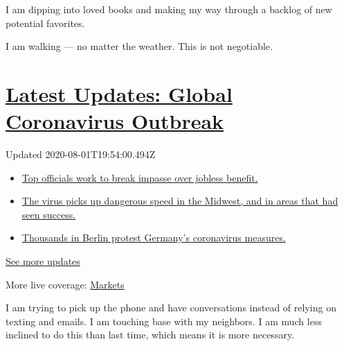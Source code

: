 I am dipping into loved books and making my way through a backlog of new
potential favorites.

I am walking --- no matter the weather. This is not negotiable.

\hypertarget{latest-updates-global-coronavirus-outbreak}{%
\section{\texorpdfstring{\href{https://www.nytimes3xbfgragh.onion/2020/08/01/world/coronavirus-covid-19.html?action=click\&pgtype=Article\&state=default\&region=MAIN_CONTENT_1\&context=storylines_live_updates}{Latest
Updates: Global Coronavirus
Outbreak}}{Latest Updates: Global Coronavirus Outbreak}}\label{latest-updates-global-coronavirus-outbreak}}

Updated 2020-08-01T19:54:00.494Z

\begin{itemize}
\tightlist
\item
  \href{https://www.nytimes3xbfgragh.onion/2020/08/01/world/coronavirus-covid-19.html?action=click\&pgtype=Article\&state=default\&region=MAIN_CONTENT_1\&context=storylines_live_updates\#link-3ac56579}{Top
  officials work to break impasse over jobless benefit.}
\item
  \href{https://www.nytimes3xbfgragh.onion/2020/08/01/world/coronavirus-covid-19.html?action=click\&pgtype=Article\&state=default\&region=MAIN_CONTENT_1\&context=storylines_live_updates\#link-8796723}{The
  virus picks up dangerous speed in the Midwest, and in areas that had
  seen success.}
\item
  \href{https://www.nytimes3xbfgragh.onion/2020/08/01/world/coronavirus-covid-19.html?action=click\&pgtype=Article\&state=default\&region=MAIN_CONTENT_1\&context=storylines_live_updates\#link-25930521}{Thousands
  in Berlin protest Germany's coronavirus measures.}
\end{itemize}

\href{https://www.nytimes3xbfgragh.onion/2020/08/01/world/coronavirus-covid-19.html?action=click\&pgtype=Article\&state=default\&region=MAIN_CONTENT_1\&context=storylines_live_updates}{See
more updates}

More live coverage:
\href{https://www.nytimes3xbfgragh.onion/live/2020/07/31/business/stock-market-today-coronavirus?action=click\&pgtype=Article\&state=default\&region=MAIN_CONTENT_1\&context=storylines_live_updates}{Markets}

I am trying to pick up the phone and have conversations instead of
relying on texting and emails. I am touching base with my neighbors. I
am much less inclined to do this than last time, which means it is more
necessary.

